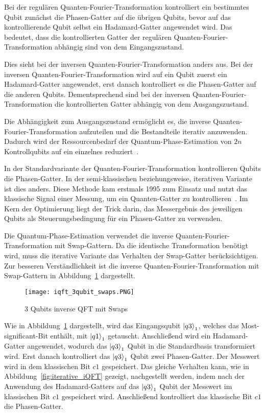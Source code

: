 Bei der regulären Quanten-Fourier-Transformation kontrolliert ein bestimmtes Qubit zunächst die Phasen-Gatter auf die übrigen Qubits, 
bevor auf das kontrollierende Qubit selbst ein Hadamard-Gatter angewendet wird.
Das bedeutet, dass die kontrollierten Gatter der regulären Quanten-Fourier-Transformation abhängig sind von dem Eingangszustand.

Dies sieht bei der inversen Quanten-Fourier-Transformation anders aus.
Bei der inversen Quanten-Fourier-Transformation wird auf ein Qubit zuerst ein Hadamard-Gatter angewendet, 
erst danach kontrolliert es die Phasen-Gatter auf die anderen Qubits.
Dementsprechend sind bei der inversen Quanten-Fourier-Transformation die kontrollierten Gatter abhängig von dem Ausgangszustand.

Die Abhängigkeit zum Ausgangszustand ermöglicht es, 
die inverse Quanten-Fourier-Transformation aufzuteilen und die Bestandteile iterativ anzuwenden.
Dadurch wird der Ressourcenbedarf der Quantum-Phase-Estimation von \(2n\) Kontrollqubits auf ein einzelnes reduziert~\cite{Parker2000}.

In der Standardvariante der Quanten-Fourier-Transformation kontrollieren Qubits die Phasen-Gatter.
In der semi-klassischen beziehungsweise, iterativen Variante ist dies anders.
Diese Methode kam erstmals 1995 zum Einsatz und 
nutzt das klassische Signal einer Messung, 
um ein Quanten-Gatter zu kontrollieren~\cite{Griffiths_1996}.
Im Kern der Optimierung liegt der Trick darin, 
das Messergebnis des jeweiligen Qubits als Steuerungsbedingung für ein Phasen-Gatter zu verwenden.

Die Quantum-Phase-Estimation verwendet die inverse Quanten-Fourier-Transformation mit Swap-Gattern.
Da die identische Transformation benötigt wird, 
muss die iterative Variante das Verhalten der Swap-Gatter berücksichtigen.
Zur besseren Verständlichkeit ist die inverse Quanten-Fourier-Transformation mit Swap-Gattern in Abbildung~\ref{fig:iQFTswaps} dargestellt.
\begin{figure}[H]
  \centering
  \texttt{[image: iqft\_3qubit\_swaps.PNG]}
  \caption{3 Qubits inverse QFT mit Swaps}
  \label{fig:iQFTswaps}
\end{figure}
Wie in Abbildung~\ref{fig:iQFTswaps} dargestellt, 
wird das Eingangsqubit \(\ket{q3}_1\), welches das Most-significant-Bit enthält, 
mit \(\ket{q1}_1\) getauscht. 
Anschließend wird ein Hadamard-Gatter angewendet, 
wodurch das \(\ket{q3}_1\) Qubit in die Standardbasis transformiert wird. 
Erst danach kontrolliert das \(\ket{q3}_1\) Qubit zwei Phasen-Gatter.
Der Messwert wird in dem klassischen Bit \(c1\) gespeichert.
Das gleiche Verhalten kann, wie in Abbildung~\ref{fig:iterative_iQFT} gezeigt, nachgestellt werden, 
indem nach der Anwendung des Hadamard-Gatters auf das \(\ket{q3}_1\) Qubit 
der Messwert im klassischen Bit \(c1\) gespeichert wird.
Anschließend kontrolliert das klassische Bit \(c1\) die Phasen-Gatter.

